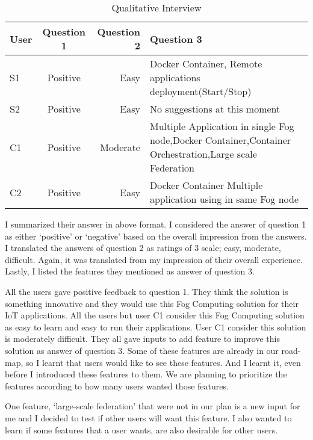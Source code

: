 \begin{table}[H]
\centering
  \begin{tabular}{ | l | c | r | p{80mm} |}
    \hline
    User & Question 1 & Question 2 & Question 3 \\ \hline
    S1 & Positive & Easy & Docker Container, \newline Remote applications deployment(Start/Stop) \\ \hline
    S2 & Positive & Easy & No suggestions at this moment \\ \hline 
    C1 & Positive & Moderate &   Multiple Application in single Fog node,\newline Docker Container,\newline Container Orchestration,\newline Large scale Federation \\\hline
    C2 & Positive & Easy & Docker Container \newline Multiple application using in same Fog node \\\hline
  \end{tabular}
  \caption{Qualitative Interview}
  \label{table:quantative}
\end{table}

I summarized their answer in above format. I considered the answer of question 1 as either `positive' or `negative' based on the overall impression from the answers. I translated the answers of question 2 as ratings of 3 scale; easy, moderate, difficult. Again, it was translated from my impression of their overall experience. Lastly, I listed the features they mentioned as answer of question 3. 

All the users gave positive feedback to question 1. They think the solution is something innovative and they would use this Fog Computing solution for their \ac{IoT} applications. All the users but user C1 consider this Fog Computing solution as easy to learn and easy to run their applications. User C1 consider this solution is moderately difficult. They all gave inputs to add feature to improve this solution as answer of question 3. Some of these features are already in our road-map, so I learnt that users would like to see these features. And I learnt it, even before I introduced these features to them. We are planning to prioritize the features according to how many users wanted those features. 

One feature, `large-scale federation'  that were not in our plan is a new input for me and I decided to test if other users will want this feature.  I also wanted to learn if some features that a user wants, are also desirable for other users. 


